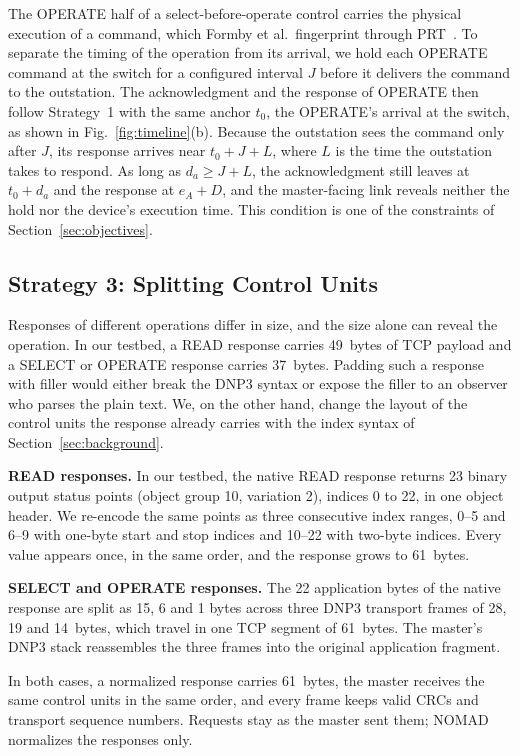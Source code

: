 \documentclass[conference]{IEEEtran}
\begin{document}
The OPERATE half of a select-before-operate control carries the physical execution of a command, which Formby et al.\ fingerprint through PRT~\cite{formby2016}. To separate the timing of the operation from its arrival, we hold each OPERATE command at the switch for a configured interval $J$ before it delivers the command to the outstation. The acknowledgment and the response of OPERATE then follow Strategy~1 with the same anchor $t_0$, the OPERATE's arrival at the switch, as shown in Fig.~\ref{fig:timeline}(b). Because the outstation sees the command only after $J$, its response arrives near $t_0 + J + L$, where $L$ is the time the outstation takes to respond. As long as $d_a \geq J + L$, the acknowledgment still leaves at $t_0 + d_a$ and the response at $e_A + D$, and the master-facing link reveals neither the hold nor the device's execution time. This condition is one of the constraints of Section~\ref{sec:objectives}.

\subsection{Strategy 3: Splitting Control Units}

Responses of different operations differ in size, and the size alone can reveal the operation. In our testbed, a READ response carries 49~bytes of TCP payload and a SELECT or OPERATE response carries 37~bytes. Padding such a response with filler would either break the DNP3 syntax or expose the filler to an observer who parses the plain text. We, on the other hand, change the layout of the control units the response already carries with the index syntax of Section~\ref{sec:background}.

\textbf{READ responses.} In our testbed, the native READ response returns 23 binary output status points (object group 10, variation 2), indices 0 to 22, in one object header. We re-encode the same points as three consecutive index ranges, 0--5 and 6--9 with one-byte start and stop indices and 10--22 with two-byte indices. Every value appears once, in the same order, and the response grows to 61~bytes.

\textbf{SELECT and OPERATE responses.} The 22 application bytes of the native response are split as 15, 6 and 1 bytes across three DNP3 transport frames of 28, 19 and 14~bytes, which travel in one TCP segment of 61~bytes. The master's DNP3 stack reassembles the three frames into the original application fragment.

In both cases, a normalized response carries 61~bytes, the master receives the same control units in the same order, and every frame keeps valid CRCs and transport sequence numbers. Requests stay as the master sent them; NOMAD normalizes the responses only.
\end{document}
